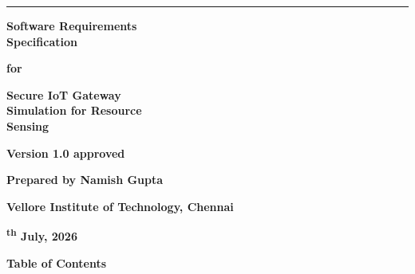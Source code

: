\documentclass[12pt,letterpaper]{article}
\begin{document}
\thispagestyle{titlepage}
\vspace*{0.10in}
\noindent\rule{\linewidth}{4.5pt}

\vspace{0.48in}
\begin{flushright}
{\sffamily\bfseries\fontsize{32}{34}\selectfont Software Requirements\\Specification\par}
\vspace{0.49in}
{\sffamily\bfseries\fontsize{20}{22}\selectfont for\par}
\vspace{0.35in}
{\sffamily\bfseries\fontsize{32}{34}\selectfont Secure IoT Gateway\\Simulation for Resource\\Sensing\par}
\vspace{0.62in}
{\sffamily\bfseries\fontsize{14}{16}\selectfont Version 1.0 approved\par}
\vspace{0.58in}
{\sffamily\bfseries\fontsize{14}{16}\selectfont Prepared by Namish Gupta\par}
\vspace{0.58in}
{\sffamily\bfseries\fontsize{14}{16}\selectfont Vellore Institute of Technology, Chennai\par}
\vspace{0.58in}
{\sffamily\bfseries\fontsize{14}{16}\textsuperscript{th} July, 2026\par}
\end{flushright}
\restoregeometry
\clearpage
{}
\setcounter{page}{2}
\thispagestyle{srs}
\vspace*{-0.65in}
{\bfseries\fontsize{18}{20}\selectfont Table of Contents\par}
\vspace{0.17in}
\begingroup
\fontsize{11}{11}\selectfont
\setlength{\parskip}{0pt}
\end{document}

